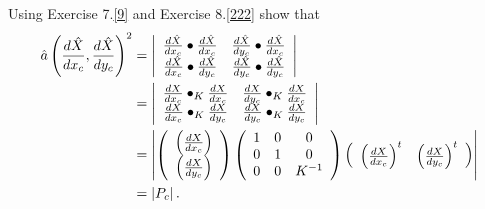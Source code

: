 \begin{exercise}
Using Exercise 7.\ref{9} and Exercise 8.\ref{222} show that%
\begin{align*}
\hat{a}\left(  \frac{d\hat{X}}{dx_{c}},\frac{d\hat{X}}{dy_{c}}\right)  ^{2}
&  =\left\vert
\begin{array}
[c]{cc}%
\frac{d\hat{X}}{dx_{c}}\bullet\frac{d\hat{X}}{dx_{c}} & \frac{d\hat{X}}%
{dy_{c}}\bullet\frac{d\hat{X}}{dx_{c}}\\
\frac{d\hat{X}}{dx_{c}}\bullet\frac{d\hat{X}}{dy_{c}} & \frac{d\hat{X}}%
{dy_{c}}\bullet\frac{d\hat{X}}{dy_{c}}%
\end{array}
\right\vert \\
&  =\left\vert
\begin{array}
[c]{cc}%
\frac{dX}{dx_{c}}\bullet_{K}\frac{dX}{dx_{c}} & \frac{dX}{dy_{c}}\bullet
_{K}\frac{dX}{dx_{c}}\\
\frac{dX}{dx_{c}}\bullet_{K}\frac{dX}{dy_{c}} & \frac{dX}{dy_{c}}\bullet
_{K}\frac{dX}{dy_{c}}%
\end{array}
\right\vert \\
&  =\left\vert \left(
\begin{array}
[c]{c}%
\left(  \frac{dX}{dx_{c}}\right) \\
\left(  \frac{dX}{dy_{c}}\right)
\end{array}
\right)  \left(
\begin{array}
[c]{ccc}%
1 & 0 & 0\\
0 & 1 & 0\\
0 & 0 & K^{-1}%
\end{array}
\right)  \left(
\begin{array}
[c]{cc}%
\left(  \frac{dX}{dx_{c}}\right)  ^{t} & \left(  \frac{dX}{dy_{c}}\right)
^{t}%
\end{array}
\right)  \right\vert \\
&  =\left\vert P_{c}\right\vert .
\end{align*}

\end{exercise}

